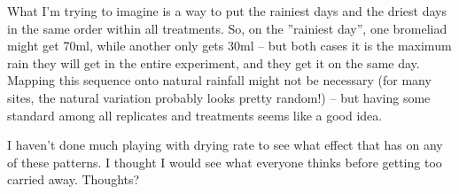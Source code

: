\documentclass[10pt]{article}
\begin{document}
\begin{spacing}{1.5}
What I'm trying to imagine is a way to put the rainiest days and the
driest days in the same order within all treatments.  So, on the
''rainiest day'', one bromeliad might get 70ml, while another only
gets 30ml -- but both cases it is the maximum rain they will get in
the entire experiment, and they get it on the same day.  Mapping this
sequence onto natural rainfall might not be necessary (for many sites,
the natural variation probably looks pretty random!) -- but having
some standard among all replicates and treatments seems like a good
idea.

I haven't done much playing with drying rate to see what effect that
has on any of these patterns.  I thought I would see what everyone
thinks before getting too carried away.  Thoughts?


\end{spacing}
\end{document}
